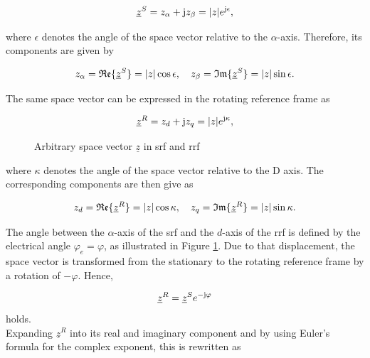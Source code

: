 \begin{equation*}
	\underline{z}^{S}
	=
	z_\alpha + \mathrm{j} z_\beta
	=
	\lvert z\rvert e^{\mathrm{j}\epsilon},
\end{equation*}

where $\epsilon$ denotes the angle of the space vector relative to the $\alpha$-axis. Therefore, its components are given by

\begin{equation*}
	z_\alpha = \mathfrak{Re}\{\underline{z}^{S}\}
	= \lvert z\rvert\cos\epsilon,\quad
	z_\beta = \mathfrak{Im}\{\underline{z}^{S}\}
	= \lvert z\rvert\sin\epsilon.
\end{equation*}

The same space vector can be expressed in the rotating reference frame as

\begin{equation*}
	\underline{z}^{R}
	=
	z_d + \mathrm{j} z_q
	=
	\lvert z\rvert e^{\mathrm{j}\kappa},
	\label{equ:0_sv_rrf}
\end{equation*}

\begin{figure}[h]
	\centering
	
	\caption{Arbitrary space vector $\underline{z}$ in \acrshort{srf} and \acrshort{rrf}}
	\label{fig:0_refframes}
\end{figure}

where $\kappa$ denotes the angle of the space vector relative to the D axis. The corresponding components are then give as

\begin{equation*}
	z_d = \mathfrak{Re}\{ \underline{z}^{R} \}
	= \lvert z\rvert\cos\kappa,\quad
	z_q = \mathfrak{Im}\{ \underline{z}^{R} \}
	= \lvert z\rvert\sin\kappa.
\end{equation*}

The angle between the $\alpha$-axis of the \acrshort{srf} and the $d$-axis of the \acrshort{rrf} is defined by the electrical angle $\varphi_e =  \varphi$, as illustrated in Figure \ref{fig:0_refframes}. Due to that displacement, the space vector is transformed from the stationary to the rotating reference frame by a rotation of $-\varphi$. Hence,

\begin{equation*}
	\underline{z}^{R}
	=
	\underline{z}^{S}e^{-\mathrm{j}\varphi}
\end{equation*}
holds.\\
Expanding $\underline{z}^{R}$ into its real and imaginary component and by using Euler's formula for the complex exponent, this is rewritten as

